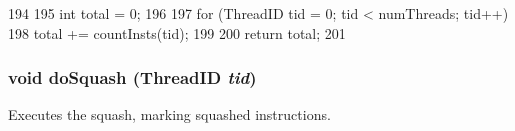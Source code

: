 \begin{DoxyCode}
194 {
195     int total = 0;
196 
197     for (ThreadID tid = 0; tid < numThreads; tid++)
198         total += countInsts(tid);
199 
200     return total;
201 }
\end{DoxyCode}
\hypertarget{classROB_a06cf52c4f09162bea03ec848f247151a}{
\subsubsection[{doSquash}]{\setlength{\rightskip}{0pt plus 5cm}void doSquash ({\bf ThreadID} {\em tid})}}
\label{classROB_a06cf52c4f09162bea03ec848f247151a}
Executes the squash, marking squashed instructions. 


